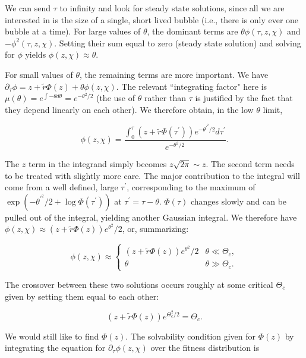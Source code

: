 \documentclass[10pt]{revtex4}
\begin{document}
We can send $\tau$ to infinity and look for steady state solutions, since all we are interested in is the size of a single, short lived bubble (i.e., there is only ever one bubble at a time).
For large values of $\theta$, the dominant terms are $\theta \phi(\tau,z,\chi)$ and $-\phi^2(\tau,z,\chi)$.
Setting their sum equal to zero (steady state solution) and solving for $\phi$ yields $\phi(z,\chi) \approx \theta$.

For small values of $\theta$, the remaining terms are more important.
We have $\partial_\tau \phi = z + \tilde{r} \Phi(z) + \theta \phi(z, \chi)$.
The relevant ``integrating factor" here is $\mu(\theta) = e^{\int -\theta d\theta} = e^{-\theta^2/2}$ (the use of $\theta$ rather than $\tau$ is justified by the fact that they depend linearly on each other).
We therefore obtain, in the low $\theta$ limit,

\begin{equation}
\phi(z,\chi) = \frac{\int_0^\tau (z+\tilde{r}\Phi(\tau^\prime)) e^{-\theta^\prime^2/2} d\tau^\prime}{e^{-\theta^2/2}}.
\end{equation}

The $z$ term in the integrand simply becomes $z\sqrt{2\pi} \sim z$.
The second term needs to be treated with slightly more care.
The major contribution to the integral will come from a well defined, large $\tau^\prime$, corresponding to the maximum of $\exp(-\theta^\prime^2/2 + \log \Phi(\tau^\prime))$ at $\tau^\prime = \tau - \theta$.
$\Phi(\tau)$ changes slowly and can be pulled out of the integral, yielding another Gaussian integral.
We therefore have $\phi(z,\chi) \approx (z+\tilde{r}\Phi(z))e^{\theta^2}/2$, or, summarizing:

\begin{equation}
\phi(z,\chi) \approx
\begin{cases}
(z+\tilde{r}\Phi(z))e^{\theta^2}/2 & \theta \ll \Theta_c, \\
\theta & \theta \gg \Theta_c.
\end{cases}
\end{equation}


The crossover between these two solutions occurs roughly at some critical $\Theta_c$ given by setting them equal to each other: 

\begin{equation}
(z+\tilde{r}\Phi(z))e^{\Theta_c^2/2} = \Theta_c.
\end{equation}

We would still like to find $\Phi(z)$. The solvability condition given for $\Phi(z)$ by integrating the equation for $\partial_\tau \phi(z,\chi)$ over the fitness distribution is
\end{document}
